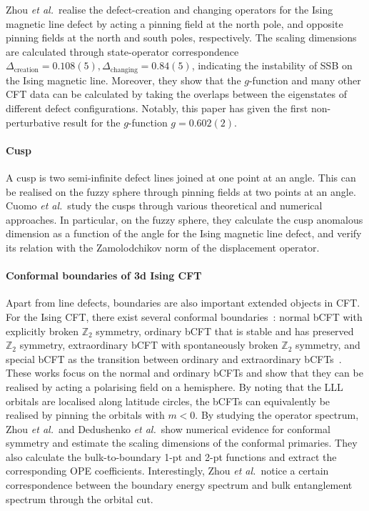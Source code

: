 \documentclass{timesjhep}
\begin{document}
Zhou \textit{et al.}~realise the defect-creation and changing operators for the Ising magnetic line defect by acting a pinning field at the north pole, and opposite pinning fields at the north and south poles, respectively. The scaling dimensions are calculated through state-operator correspondence $\Delta_{\textrm{creation}}=0.108(5),\Delta_{\textrm{changing}}=0.84(5)$, indicating the instability of SSB on the Ising magnetic line. Moreover, they show that the $g$-function and many other CFT data can be calculated by taking the overlaps between the eigenstates of different defect configurations. Notably, this paper has given the first non-perturbative result for the $g$-function $g=0.602(2)$.

\paragraph{Cusp~\cite{Cuomo2024}}

A cusp is two semi-infinite defect lines joined at one point at an angle. This can be realised on the fuzzy sphere through pinning fields at two points at an angle. Cuomo \textit{et al.}~study the cusps through various theoretical and numerical approaches. In particular, on the fuzzy sphere, they calculate the cusp anomalous dimension as a function of the angle for the Ising magnetic line defect, and verify its relation with the Zamolodchikov norm of the displacement operator.

\paragraph{Conformal boundaries of 3d Ising CFT~\cite{Zhou2024Jul,Dedushenko2024}}

Apart from line defects, boundaries are also important extended objects in CFT. For the Ising CFT, there exist several conformal boundaries~: normal bCFT with explicitly broken $\mathbb{Z}_2$ symmetry, ordinary bCFT that is stable and has preserved $\mathbb{Z}_2$ symmetry, extraordinary bCFT with spontaneously broken $\mathbb{Z}_2$ symmetry, and special bCFT as the transition between ordinary and extraordinary bCFTs~\cite{Metlitski2020IsingBd,Krishnan2023IsingBd,Giombi2023IsingBd}. These works focus on the normal and ordinary bCFTs and show that they can be realised by acting a polarising field on a hemisphere. By noting that the LLL orbitals are localised along latitude circles, the bCFTs can equivalently be realised by pinning the orbitals with $m<0$. By studying the operator spectrum, Zhou \textit{et al.}~and Dedushenko \textit{et al.}~show numerical evidence for conformal symmetry and estimate the scaling dimensions of the conformal primaries. They also calculate the bulk-to-boundary 1-pt and 2-pt functions and extract the corresponding OPE coefficients. Interestingly, Zhou \textit{et al.}~notice a certain correspondence between the boundary energy spectrum and bulk entanglement spectrum through the orbital cut.
\end{document}
